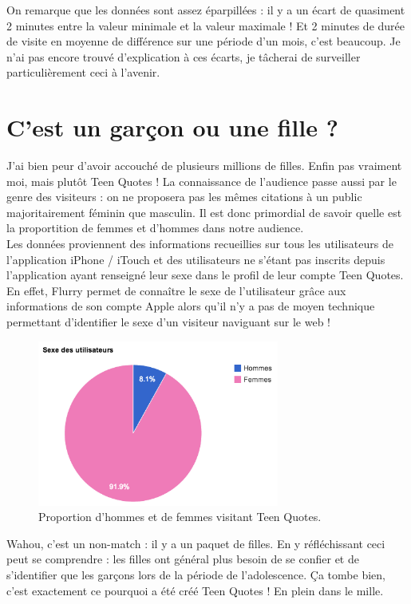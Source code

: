 \documentclass{report}
\begin{document}
	On remarque que les données sont assez éparpillées : il y a un écart de quasiment 2 minutes entre la valeur minimale et la valeur maximale ! Et 2 minutes de durée de visite en moyenne de différence sur une période d'un mois, c'est beaucoup. Je n'ai pas encore trouvé d'explication à ces écarts, je tâcherai de surveiller particulièrement ceci à l'avenir.

	\section{C'est un garçon ou une fille ?}
	J'ai bien peur d'avoir accouché de plusieurs millions de filles. Enfin pas vraiment moi, mais plutôt Teen Quotes ! La connaissance de l'audience passe aussi par le genre des visiteurs : on ne proposera pas les mêmes citations à un public majoritairement féminin que masculin. Il est donc primordial de savoir quelle est la proportition de femmes et d'hommes dans notre audience.\\

	Les données proviennent des informations recueillies sur tous les utilisateurs de l'application iPhone / iTouch et des utilisateurs ne s'étant pas inscrits depuis l'application ayant renseigné leur sexe dans le profil de leur compte Teen Quotes. En effet, Flurry permet de connaître le sexe de l'utilisateur grâce aux informations de son compte Apple alors qu'il n'y a pas de moyen technique permettant d'identifier le sexe d'un visiteur naviguant sur le web !
	\begin{figure}[H]
		\center
		\includegraphics[width=300px]{images/sexeUtilisateurs.png}
		\caption{Proportion d'hommes et de femmes visitant Teen Quotes.}
	\end{figure}
	Wahou, c'est un non-match : il y a un paquet de filles. En y réfléchissant ceci peut se comprendre : les filles ont général plus besoin de se confier et de s'identifier que les garçons lors de la période de l'adolescence. Ça tombe bien, c'est exactement ce pourquoi a été créé Teen Quotes ! En plein dans le mille.
\end{document}
